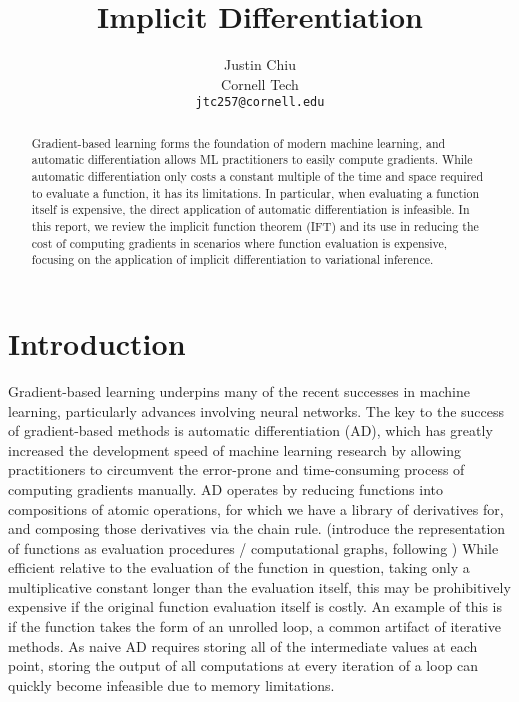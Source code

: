 \documentclass[11pt]{article}
\title{Implicit Differentiation}
\author{Justin Chiu \\
  Cornell Tech \\
  \texttt{jtc257@cornell.edu}}
\begin{document}
\maketitle
\begin{abstract}
Gradient-based learning forms the foundation of modern machine learning,
and automatic differentiation allows ML practitioners to easily compute gradients.
While automatic differentiation only costs a constant multiple of the time and space
required to evaluate a function, it has its limitations.
In particular, when evaluating a function itself is expensive,
the direct application of automatic differentiation is infeasible.
In this report, we review the implicit function theorem (IFT)
and its use in reducing the cost of computing gradients in scenarios where
function evaluation is expensive,
focusing on the application of implicit differentiation to variational inference.
\end{abstract}

\section{Introduction}
Gradient-based learning underpins many of the recent successes in machine learning,
particularly advances involving neural networks.
The key to the success of gradient-based methods is automatic differentiation (AD),
which has greatly increased the development speed of machine learning research by
allowing practitioners to circumvent the error-prone and time-consuming process
of computing gradients manually.
AD operates by reducing functions into compositions of atomic operations,
for which we have a library of derivatives for,
and composing those derivatives via the chain rule.
(introduce the representation of functions as evaluation procedures / computational graphs,
following \citet{griewank2008autodiff})
While efficient relative to the evaluation of the function in question,
taking only a multiplicative constant longer than the evaluation itself,
this may be prohibitively expensive if the original function evaluation itself is costly.
An example of this is if the function takes the form of an unrolled loop,
a common artifact of iterative methods.
As naive AD requires storing all of the intermediate values at each point,
storing the output of all computations at every iteration of a loop can quickly
become infeasible due to memory limitations.
\end{document}
